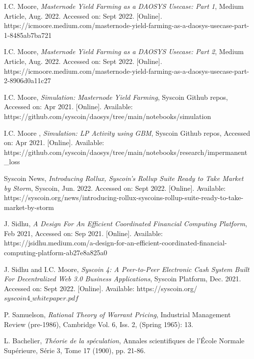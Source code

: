 \documentclass[journal,twocolumn,12pt]{ieeesyscoin}
\begin{document}
\begin{thebibliography}{00}
 I.C. Moore,  \textit{Masternode Yield Farming as a DAOSYS Usecase: Part 1}, Medium Article, Aug. 2022. Accessed on: Sept 2022.  [Online]. https://icmoore.medium.com/masternode-yield-farming-as-a-daosys-usecase-part-1-8485ab7ba721

 I.C. Moore,  \textit{Masternode Yield Farming as a DAOSYS Usecase: Part 2}, Medium Article, Aug. 2022. Accessed on: Sept 2022.  [Online]. https://icmoore.medium.com/masternode-yield-farming-as-a-daosys-usecase-part-2-8906d0a11c27

 I.C. Moore, \textit{Simulation: Masternode Yield Farming}, Syscoin Github repos, Accessed on: Apr 2021.  [Online]. Available: https://github.com/syscoin/daosys/tree/main/notebooks/simulation

 I.C. Moore , \textit{Simulation: LP Activity using GBM}, Syscoin Github repos, Accessed on: Apr 2021.  [Online]. Available: https://github.com/syscoin/daosys/tree/main/notebooks/research/impermanent\_loss


 Syscoin News, \textit{Introducing Rollux, Syscoin's Rollup Suite Ready to Take Market by Storm}, Syscoin, Jun. 2022. Accessed on: Sept 2022.  [Online]. Available: https://syscoin.org/news/introducing-rollux-syscoins-rollup-suite-ready-to-take-market-by-storm

 J. Sidhu, \textit{A Design For An Efficient Coordinated Financial Computing Platform}, Feb 2021, Accessed on: Sep 2021.  [Online]. Available:  https://jsidhu.medium.com/a-design-for-an-efficient-coordinated-financial-computing-platform-ab27e8a825a0

 J. Sidhu and I.C. Moore, \textit{Syscoin 4: A Peer-to-Peer Electronic Cash System Built For Decentralized
Web 3.0 Business Applications}, Syscoin Platform, Dec. 2021. Accessed on: Sept 2022. [Online]. Available: https://syscoin.org/$syscoin4\_whitepaper.pdf$

 P. Samuelson, \textit{Rational Theory of Warrant Pricing}, Industrial Management Review (pre-1986), Cambridge Vol. 6, Iss. 2, (Spring 1965): 13.

 L. Bachelier, \textit{Théorie de la spéculation},  Annales scientifiques de l'École Normale Supérieure, Série 3, Tome 17 (1900), pp. 21-86.


\end{thebibliography}


\EOD
\end{document}
